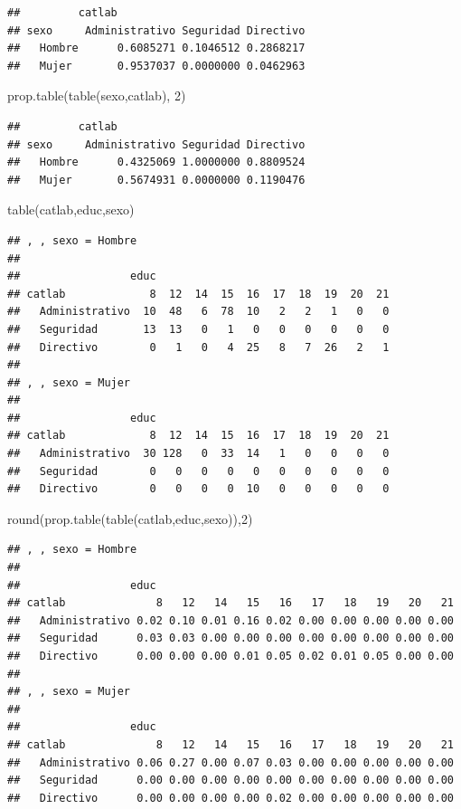 \documentclass[
]{book}
\newenvironment{Shaded}{\begin{snugshade}}{\end{snugshade}}
\newcommand{\DecValTok}[1]{\textcolor[rgb]{0.00,0.00,0.81}{#1}}
\newcommand{\FunctionTok}[1]{\textcolor[rgb]{0.00,0.00,0.00}{#1}}
\newcommand{\NormalTok}[1]{#1}
\theoremstyle{break}
\begin{document}
\begin{verbatim}
##         catlab
## sexo     Administrativo Seguridad Directivo
##   Hombre      0.6085271 0.1046512 0.2868217
##   Mujer       0.9537037 0.0000000 0.0462963
\end{verbatim}

\begin{Shaded}
\begin{Highlighting}[]
\FunctionTok{prop.table}\NormalTok{(}\FunctionTok{table}\NormalTok{(sexo,catlab), }\DecValTok{2}\NormalTok{)}
\end{Highlighting}
\end{Shaded}

\begin{verbatim}
##         catlab
## sexo     Administrativo Seguridad Directivo
##   Hombre      0.4325069 1.0000000 0.8809524
##   Mujer       0.5674931 0.0000000 0.1190476
\end{verbatim}

\begin{Shaded}
\begin{Highlighting}[]
\FunctionTok{table}\NormalTok{(catlab,educ,sexo)}
\end{Highlighting}
\end{Shaded}

\begin{verbatim}
## , , sexo = Hombre
## 
##                 educ
## catlab             8  12  14  15  16  17  18  19  20  21
##   Administrativo  10  48   6  78  10   2   2   1   0   0
##   Seguridad       13  13   0   1   0   0   0   0   0   0
##   Directivo        0   1   0   4  25   8   7  26   2   1
## 
## , , sexo = Mujer
## 
##                 educ
## catlab             8  12  14  15  16  17  18  19  20  21
##   Administrativo  30 128   0  33  14   1   0   0   0   0
##   Seguridad        0   0   0   0   0   0   0   0   0   0
##   Directivo        0   0   0   0  10   0   0   0   0   0
\end{verbatim}

\begin{Shaded}
\begin{Highlighting}[]
\FunctionTok{round}\NormalTok{(}\FunctionTok{prop.table}\NormalTok{(}\FunctionTok{table}\NormalTok{(catlab,educ,sexo)),}\DecValTok{2}\NormalTok{)}
\end{Highlighting}
\end{Shaded}

\begin{verbatim}
## , , sexo = Hombre
## 
##                 educ
## catlab              8   12   14   15   16   17   18   19   20   21
##   Administrativo 0.02 0.10 0.01 0.16 0.02 0.00 0.00 0.00 0.00 0.00
##   Seguridad      0.03 0.03 0.00 0.00 0.00 0.00 0.00 0.00 0.00 0.00
##   Directivo      0.00 0.00 0.00 0.01 0.05 0.02 0.01 0.05 0.00 0.00
## 
## , , sexo = Mujer
## 
##                 educ
## catlab              8   12   14   15   16   17   18   19   20   21
##   Administrativo 0.06 0.27 0.00 0.07 0.03 0.00 0.00 0.00 0.00 0.00
##   Seguridad      0.00 0.00 0.00 0.00 0.00 0.00 0.00 0.00 0.00 0.00
##   Directivo      0.00 0.00 0.00 0.00 0.02 0.00 0.00 0.00 0.00 0.00
\end{verbatim}
\end{document}
